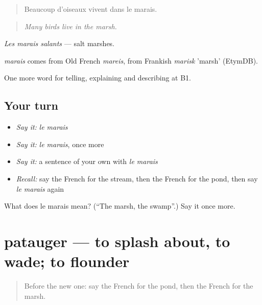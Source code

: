 \begin{quote}
Beaucoup d'oiseaux vivent dans le marais.
\end{quote}

\begin{quote}
\emph{Many birds live in the marsh.}
\end{quote}

\emph{Les marais salants} — salt marshes.

\begin{cousinweb}
\emph{marais} comes from Old French \emph{mareis}, from Frankish \emph{marisk} 'marsh' (EtymDB).
\end{cousinweb}

\begin{grammarlens}[title={What you've built}]
One more word for telling, explaining and describing at B1.
\end{grammarlens}

\subsection*{Your turn}
\begin{itemize}
\raggedright
  \item \emph{Say it:} \emph{le marais}
  \item \emph{Say it:} \emph{le marais}, once more
  \item \emph{Say it:} a sentence of your own with \emph{le marais}
  \item \emph{Recall:} say the French for the stream, then the French for the pond, then say \emph{le marais} again
\end{itemize}

\begin{tcolorbox}[breakable,colback=teal!4,colframe=teal!35!black,title={Before you move on}]
What does le marais mean? (\textquotedblleft{}The marsh, the swamp\textquotedblright{}.) Say it once more.
\end{tcolorbox}
\section[patauger]{patauger — to splash about, to wade; to flounder}

\label{lesson:FR-C456-patauger}



\begin{quote}
Before the new one: say the French for the pond, then the French for the marsh.
\end{quote}

